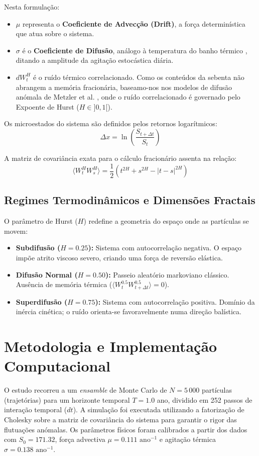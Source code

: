 \documentclass[11pt, a4paper]{article}
\begin{document}
Nesta formulação:
\begin{itemize}
    \item $\mu$ representa o \textbf{Coeficiente de Advecção (Drift)}, a força determinística que atua sobre o sistema.
    \item $\sigma$ é o \textbf{Coeficiente de Difusão}, análogo à temperatura do banho térmico \cite{sebenta}, ditando a amplitude da agitação estocástica diária.
    \item $dW_t^H$ é o ruído térmico correlacionado. Como os conteúdos da sebenta não abrangem a memória fracionária, baseamo-nos nos modelos de difusão anómala de Metzler et al. \cite{metzler2014}, onde o ruído correlacionado é governado pelo Expoente de Hurst ($H \in ]0, 1[$).
\end{itemize}

Os microestados do sistema são definidos pelos retornos logarítmicos:
\begin{equation}
\Delta x = \ln \left( \frac{S_{t+\Delta t}}{S_t} \right)
\end{equation}

A matriz de covariância exata para o cálculo fracionário assenta na relação:
\begin{equation}
\langle W_t^H W_s^H \rangle = \frac{1}{2} \left( t^{2H} + s^{2H} - |t - s|^{2H} \right)
\end{equation}

\subsection{Regimes Termodinâmicos e Dimensões Fractais}
O parâmetro de Hurst ($H$) redefine a geometria do espaço onde as partículas se movem:
\begin{itemize}
    \item \textbf{Subdifusão ($H = 0.25$):} Sistema com autocorrelação negativa. O espaço impõe atrito viscoso severo, criando uma força de reversão elástica.
    \item \textbf{Difusão Normal ($H = 0.50$):} Passeio aleatório markoviano clássico. Ausência de memória térmica ($\langle W_t^{0.5} W_{t+\Delta t}^{0.5} \rangle = 0$).
    \item \textbf{Superdifusão ($H = 0.75$):} Sistema com autocorrelação positiva. Domínio da inércia cinética; o ruído orienta-se favoravelmente numa direção balística.
\end{itemize}

\section{Metodologia e Implementação Computacional}
O estudo recorreu a um \textit{ensamble} de Monte Carlo de $N = 5\,000$ partículas (trajetórias) para um horizonte temporal $T = 1.0$ ano, dividido em 252 passos de interação temporal ($dt$). A simulação foi executada utilizando a fatorização de Cholesky sobre a matriz de covariância do sistema para garantir o rigor das flutuações anómalas. Os parâmetros físicos foram calibrados a partir dos dados com $S_0 = 171.32$, força advectiva $\mu = 0.111\text{ ano}^{-1}$ e agitação térmica $\sigma = 0.138\text{ ano}^{-1}$.
\end{document}
